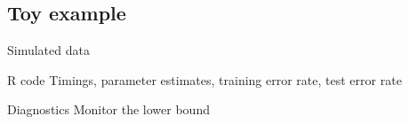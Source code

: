 \subsection{Toy example}
\begin{frame}{Simulated data}
\end{frame}
\begin{frame}{R code}
  Timings, parameter estimates, training error rate, test error rate
\end{frame}
\begin{frame}{Diagnostics}
  Monitor the lower bound
\end{frame}
